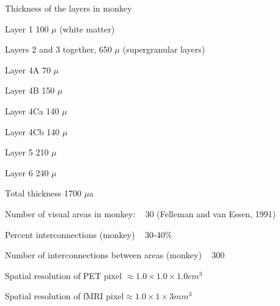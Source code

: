 \item Thickness of the layers in monkey
 \be
 \item Layer 1   100 $\mu$ (white matter)
 \item Layers 2 and 3 together,  650  $\mu$ (supergranular layers)
 \item Layer 4A   70  $\mu$
 \item Layer 4B  150  $\mu$
 \item Layer 4Ca 140  $\mu$
 \item Layer 4Cb 140  $\mu$
 \item Layer 5   210  $\mu$
 \item Layer 6   240  $\mu$
 \item Total thickness  1700  $\mu$a
 \ee

\item Number of visual areas in monkey:  ~ 30  (Felleman and van
Essen, 1991)

\item Percent interconnections (monkey) ~ 30-40\%

\item Number of interconnections between areas (monkey) ~ 300

\item Spatial resolution of PET pixel $\approx 1.0 \times 1.0 \times 1.0 cm^3$

\item Spatial resolution of fMRI pixel$\approx 1.0 \times 1 \times 3  mm^3$

\ee
